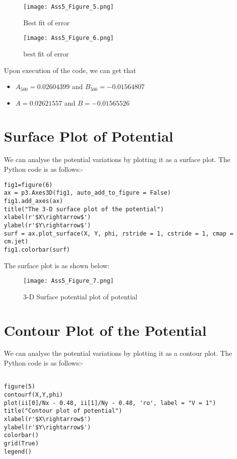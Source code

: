 \documentclass[11pt, a4paper]{article}
\begin{document}
\begin{figure}[!tbh]
 \centering
 \texttt{[image: Ass5\_Figure\_5.png]}  
 \caption{Best fit of error}
\end{figure}

\begin{figure}[!tbh]
 \centering
 \texttt{[image: Ass5\_Figure\_6.png]}  
 \caption{best fit of error}
\end{figure}

\newpage
Upon execution of the code, we can get that 
\begin{itemize}
\item
$ A_{500} = 0.02604399$ and $B_{500} = -0.01564807 $ 

\item
$A = 0.02621557$ and $B = -0.01565526$

\end{itemize}


\section{Surface Plot of Potential}

We can analyse the potential variations by plotting it as a surface plot. The Python code is as follows:-
 \begin{verbatim}
fig1=figure(6)
ax = p3.Axes3D(fig1, auto_add_to_figure = False) 
fig1.add_axes(ax)
title("The 3-D surface plot of the potential")
xlabel(r'$X\rightarrow$')
ylabel(r'$Y\rightarrow$')
surf = ax.plot_surface(X, Y, phi, rstride = 1, cstride = 1, cmap = cm.jet)
fig1.colorbar(surf)
  \end{verbatim}
    

\newpage
The surface plot is as shown below:

\begin{figure}[tbh]
 \centering
 \texttt{[image: Ass5\_Figure\_7.png]}  
 \caption{3-D Surface potential plot of potential}
\end{figure}

\section{Contour Plot of the Potential}
We can analyse the potential variations by plotting it as a contour plot. The Python code is as follows:-
 \begin{verbatim}
 
figure(5)
contourf(X,Y,phi)
plot(ii[0]/Nx - 0.48, ii[1]/Ny - 0.48, 'ro', label = "V = 1")
title("Contour plot of potential")
xlabel(r'$X\rightarrow$')
ylabel(r'$Y\rightarrow$')
colorbar()
grid(True)
legend()
  \end{verbatim}
\end{document}
